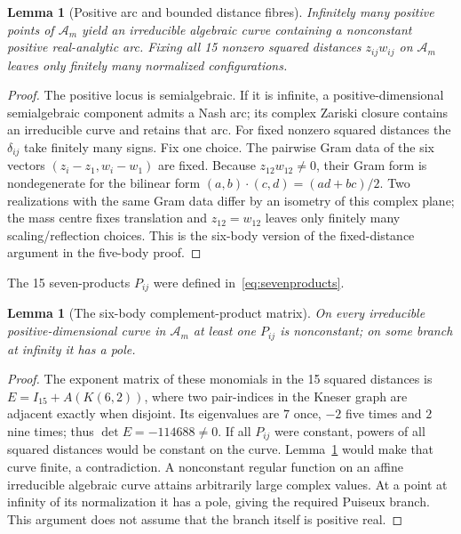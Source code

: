 \documentclass[11pt]{amsart}
\newtheorem{lemma}[theorem]{Lemma}
\theoremstyle{remark}
\newcommand{\A}{\mathcal A}
\begin{document}
\begin{lemma}[Positive arc and bounded distance fibres]\label{lem:arc}
Infinitely many positive points of $\A_m$ yield an irreducible algebraic curve containing a nonconstant positive real-analytic arc. Fixing all 15 nonzero squared distances $z_{ij}w_{ij}$ on $\A_m$ leaves only finitely many normalized configurations.
\end{lemma}
\begin{proof}
The positive locus is semialgebraic. If it is infinite, a positive-dimensional semialgebraic component admits a Nash arc; its complex Zariski closure contains an irreducible curve and retains that arc. For fixed nonzero squared distances the $\delta_{ij}$ take finitely many signs. Fix one choice. The pairwise Gram data of the six vectors $(z_i-z_1,w_i-w_1)$ are fixed. Because $z_{12}w_{12}\ne0$, their Gram form is nondegenerate for the bilinear form $(a,b)\cdot(c,d)=(ad+bc)/2$. Two realizations with the same Gram data differ by an isometry of this complex plane; the mass centre fixes translation and $z_{12}=w_{12}$ leaves only finitely many scaling/reflection choices. This is the six-body version of the fixed-distance argument in the five-body proof.
\end{proof}

The 15 seven-products $P_{ij}$ were defined in~\eqref{eq:sevenproducts}.
\begin{lemma}[The six-body complement-product matrix]\label{lem:products}
On every irreducible positive-dimensional curve in $\A_m$ at least one $P_{ij}$ is nonconstant; on some branch at infinity it has a pole.
\end{lemma}
\begin{proof}
The exponent matrix of these monomials in the 15 squared distances is $E=I_{15}+A(K(6,2))$, where two pair-indices in the Kneser graph are adjacent exactly when disjoint. Its eigenvalues are $7$ once, $-2$ five times and $2$ nine times; thus $\det E=-114688\ne0$. If all $P_{ij}$ were constant, powers of all squared distances would be constant on the curve. Lemma~\ref{lem:arc} would make that curve finite, a contradiction. A nonconstant regular function on an affine irreducible algebraic curve attains arbitrarily large complex values. At a point at infinity of its normalization it has a pole, giving the required Puiseux branch. This argument does not assume that the branch itself is positive real.
\end{proof}
\end{document}
